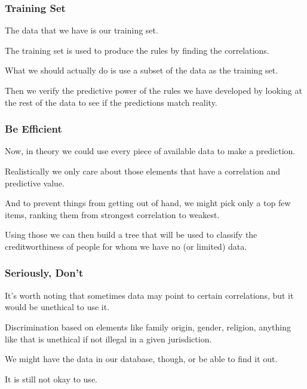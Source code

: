 \begin{frame}
\frametitle{Training Set}

The data that we have is our \alert{training set}. 

The training set is used to produce the rules by finding the correlations. 

What we should actually do is use a subset of the data as the training set. 

Then we verify the predictive power of the rules we have developed by looking at the rest of the data to see if the predictions match reality.


\end{frame}


\begin{frame}
\frametitle{Be Efficient}

Now, in theory we could use every piece of available data to make a prediction. 

Realistically we only care about those elements that have a correlation and predictive value. 

And to prevent things from getting out of hand, we might pick only a top few items, ranking them from strongest correlation to weakest. 

Using those we can then build a tree that will be used to classify the creditworthiness of people for whom we have no (or limited) data.

\end{frame}

\begin{frame}
\frametitle{Seriously, Don't}

It's worth noting that sometimes data may point to certain correlations, but it would be unethical to use it. 

Discrimination based on elements like family origin, gender, religion, anything like that is unethical if not illegal in a given jurisdiction. 

We might have the data in our database, though, or be able to find it out.

It is still not okay to use.

\end{frame}


